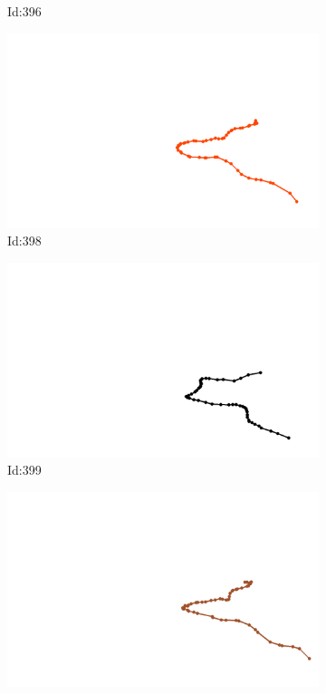 \documentclass[12pt,twoside]{report}
\begin{document}
\begin{figure}
\begin{subfigure}[b]{0.20\textwidth}
\caption{Id:396}
\end{subfigure}
\begin{subfigure}[b]{0.20\textwidth}
\centering
\includegraphics[width=\textwidth]{../trajectories/398.png}
\caption{Id:398}
\end{subfigure}
\begin{subfigure}[b]{0.20\textwidth}
\centering
\includegraphics[width=\textwidth]{../trajectories/399.png}
\caption{Id:399}
\end{subfigure}
\begin{subfigure}[b]{0.20\textwidth}
\centering
\includegraphics[width=\textwidth]{../trajectories/408.png}

\end{subfigure}
\end{figure}
\end{document}
